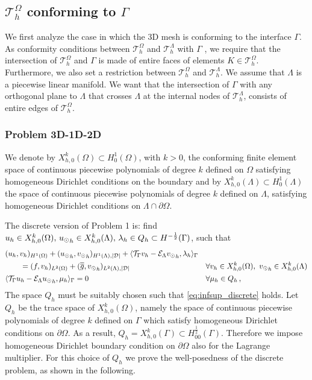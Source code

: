 \subsection{$\mathcal{T}^{\Omega}_h$ conforming to $\Gamma$}
 We first analyze the case in which the 3D mesh is conforming to the interface $\Gamma$. As conformity conditions between $\mathcal{T}^{\Omega}_h$ and $\mathcal{T}^{\Lambda}_h$ with $\Gamma$ , we require that the intersection of $\mathcal{T}^{\Omega}_h$ and $\Gamma$ is made of entire faces of elements $K \in \mathcal{T}^{\Omega}_h$. Furthermore, we also set a restriction between $\mathcal{T}^{\Omega}_h$ and $\mathcal{T}^{\Lambda}_h$. We assume that $\Lambda$ is a piecewise linear manifold. We want that the intersection of $\Gamma$ with any orthogonal plane to $\Lambda$ that crosses $\Lambda$ at the internal nodes of $\mathcal{T}^{\Lambda}_h$, consists of entire edges of $\mathcal{T}^{\Omega}_h$. 
 
\subsubsection{Problem 3D-1D-2D}
We denote by $X_{h,0}^k(\Omega)\subset H^1_0(\Omega)$, with $k>0$, the conforming finite element space of continuous piecewise polynomials of degree $k$ defined on $\Omega$ satisfying homogeneous Dirichlet conditions on the boundary and by $X_{h,0}^k(\Lambda)\subset H^1_0(\Lambda)$ the space of continuous piecewise polynomials of degree $k$ defined on $\Lambda$, satisfying homogeneous Dirichlet conditions on $\Lambda \cap \partial \Omega$. 

The discrete version of Problem 1 is:
find $u_h \in X_{h,0}^k (\Omega) ,\, {u_{\odot}}_h \in X_{h,0}^k(\Lambda) ,\, \lambda_h \in Q_h \subset H^{-\frac12}(\Gamma )$, such that
\begin{subequations}
\begin{align}
&(u_h,v_h)_{H^1(\Omega)} + ({u_{\odot}}_h,{v_{\odot}}_h)_{H^1(\Lambda),|\mathcal{D}|} 
+ \langle {\mathcal{T}_\Gamma} v_h  - \mathcal{E}_{\Lambda} {v_{\odot}}_h, \lambda_h \rangle_\Gamma &&
\\
\nonumber
&\qquad= (f,v_h)_{L^2(\Omega)} + (\overline{\overline{g}},{v_{\odot}}_h)_{L^2(\Lambda),|\mathcal{D}|}
\quad && \forall v_h \in X_{h,0}^k(\Omega), \ {v_{\odot}}_h \in X_{h,0}^k(\Lambda)
\\
&   \langle {\mathcal{T}_\Gamma} u_h - \mathcal{E}_{\Lambda} {u_{\odot}}_h , \mu_h \rangle_\Gamma = 0
\quad && \forall \mu_h \in Q_h\,,
\end{align}
\end{subequations}
The space $Q_h$ must be suitably chosen such that \eqref{eq:infsup_discrete} holds. Let $Q_h$ be the trace space of $X_{h,0}^k(\Omega)$, namely the space of continuous piecewise polynomials of degree $k$ defined on $\Gamma$ which satisfy homogeneous Dirichlet conditions on $\partial \Omega$. As a result, $Q_h=X_{h,0}^k(\Gamma) \subset H^\frac12_{00}(\Gamma)$. Therefore we impose homogeneous Dirichlet boundary condition on $\partial \Omega$ also for the Lagrange multiplier. For this choice of $Q_h$ we prove the well-posedness of the discrete problem, as shown in the following. 

